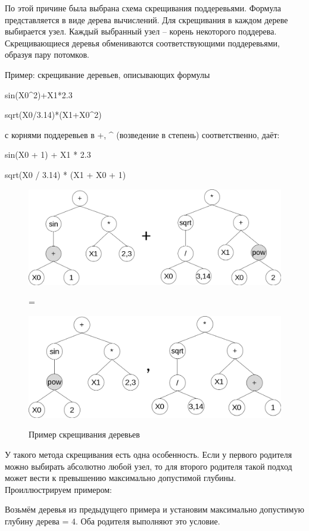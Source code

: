 По этой причине была выбрана схема скрещивания поддеревьями. Формула представляется в виде дерева вычислений. Для скрещивания в каждом дереве выбирается узел. Каждый выбранный узел – корень некоторого поддерева. Скрещивающиеся деревья обмениваются соответствующими поддеревьями, образуя пару потомков.

Пример: скрещивание деревьев, описывающих формулы 

  sin(X0^2)+X1*2.3

  sqrt(X0/3.14)*(X1+X0^2)

с корнями поддеревьев в +, \^{} (возведение в степень) соответственно, даёт:

  sin(X0 + 1) + X1 * 2.3

  sqrt(X0 / 3.14) * (X1 + X0 + 1)

\clearpage
\begin{figure}[!h]
\centering
\includegraphics[scale=0.5]{research/pics/2.png}

=

\includegraphics[scale=0.5]{research/pics/3.png}
\label{figure:crossover}
\caption{Пример скрещивания деревьев}
\end{figure}

У такого метода скрещивания есть одна особенность. Если у первого родителя можно выбирать абсолютно любой узел, то для второго родителя такой подход может вести к превышению максимально допустимой глубины. Проиллюстрируем примером:

Возьмём деревья из предыдущего примера и установим максимально допустимую глубину дерева = 4. Оба родителя выполняют это условие. 

